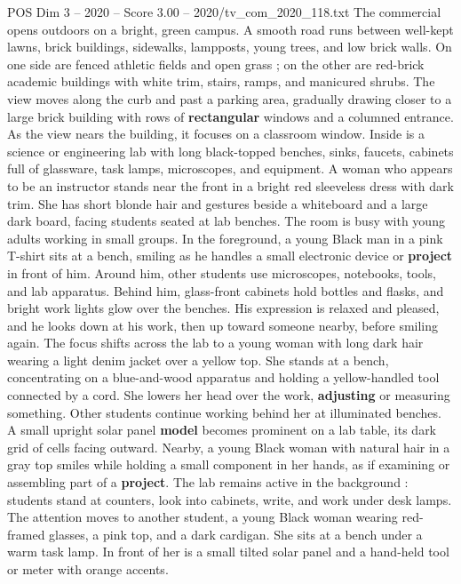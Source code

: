 \begin{textsample}{POS Dim 3 – 2020 – Score 3.00 – 2020/tv\_com\_2020\_118.txt}  \label{ex:f3_pos_078}
The commercial opens outdoors on a bright, green campus.
A smooth road runs between well-kept lawns, brick buildings, sidewalks, lampposts, young trees, and low brick walls.
On one side are fenced athletic fields and open grass ; on the other are red-brick academic buildings with white trim, stairs, ramps, and manicured shrubs.
The view moves along the curb and past a parking area, gradually drawing closer to a large brick building with rows of \textbf{rectangular} windows and a columned entrance.
As the view nears the building, it focuses on a classroom window.
Inside is a science or engineering lab with long black-topped benches, sinks, faucets, cabinets full of glassware, task lamps, microscopes, and equipment.
A woman who appears to be an instructor stands near the front in a bright red sleeveless dress with dark trim.
She has short blonde hair and gestures beside a whiteboard and a large dark board, facing students seated at lab benches.
The room is busy with young adults working in small groups.
In the foreground, a young Black man in a pink T-shirt sits at a bench, smiling as he handles a small electronic device or \textbf{project} in front of him.
Around him, other students use microscopes, notebooks, tools, and lab apparatus.
Behind him, glass-front cabinets hold bottles and flasks, and bright work lights glow over the benches.
His expression is relaxed and pleased, and he looks down at his work, then up toward someone nearby, before smiling again.
The focus shifts across the lab to a young woman with long dark hair wearing a light denim jacket over a yellow top.
She stands at a bench, concentrating on a blue-and-wood apparatus and holding a yellow-handled tool connected by a cord.
She lowers her head over the work, \textbf{adjusting} or measuring something.
Other students continue working behind her at illuminated benches.
A small upright solar panel \textbf{model} becomes prominent on a lab table, its dark grid of cells facing outward.
Nearby, a young Black woman with natural hair in a gray top smiles while holding a small component in her hands, as if examining or assembling part of a \textbf{project}.
The lab remains active in the background : students stand at counters, look into cabinets, write, and work under desk lamps.
The attention moves to another student, a young Black woman wearing red-framed glasses, a pink top, and a dark cardigan.
She sits at a bench under a warm task lamp.
In front of her is a small tilted solar panel and a hand-held tool or meter with orange accents.

\end{textsample}
